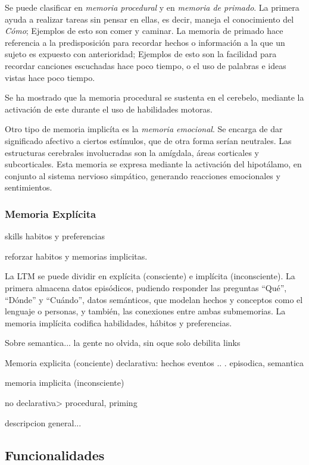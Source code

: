 Se puede clasificar en \textit{memoria procedural} y en \textit{memoria de primado}. La primera ayuda a realizar tareas sin pensar en ellas, es decir, maneja el conocimiento del \textit{C\'omo}; Ejemplos de esto son comer y caminar. La memoria de primado hace referencia a la predisposici\'on para recordar hechos o informaci\'on a la que un sujeto es expuesto con anterioridad; Ejemplos de esto son la facilidad para recordar canciones escuchadas hace poco tiempo, o el uso de palabras e ideas vistas hace poco tiempo.

Se ha mostrado que la memoria procedural se sustenta en el cerebelo, mediante la activaci\'on de este durante el uso de habilidades motoras.

Otro tipo de memoria implic\'ita es la \textit{memoria emocional}. Se encarga de dar significado afectivo a ciertos  est\'imulos, que de otra forma ser\'ian neutrales. Las estructuras cerebrales involucradas son la am\'igdala, \'areas corticales y subcorticales. Esta memoria se expresa mediante la activaci\'on del hipot\'alamo, en conjunto al sistema nervioso simp\'atico, generando reacciones emocionales y sentimientos.


\subsubsection{Memoria Expl\'icita}


skills habitos y preferencias

reforzar habitos y memorias implicitas.


La LTM se puede dividir en expl\'icita (consciente) e impl\'icita (inconsciente). La primera almacena datos epis\'odicos, pudiendo responder las preguntas ``Qu\'e'', ``D\'onde'' y ``Cu\'ando'', datos sem\'anticos, que modelan hechos y conceptos como el lenguaje o personas, y tambi\'en, las conexiones entre ambas submemorias. La memoria impl\'icita codifica habilidades, h\'abitos y preferencias.



Sobre semantica... la gente no olvida, sin oque solo debilita links


Memoria explicita (conciente)
declarativa: hechos eventos .. . episodica, semantica


memoria implicita (inconsciente)

no declarativa> procedural, priming

descripcion general...

\subsection{Funcionalidades}

